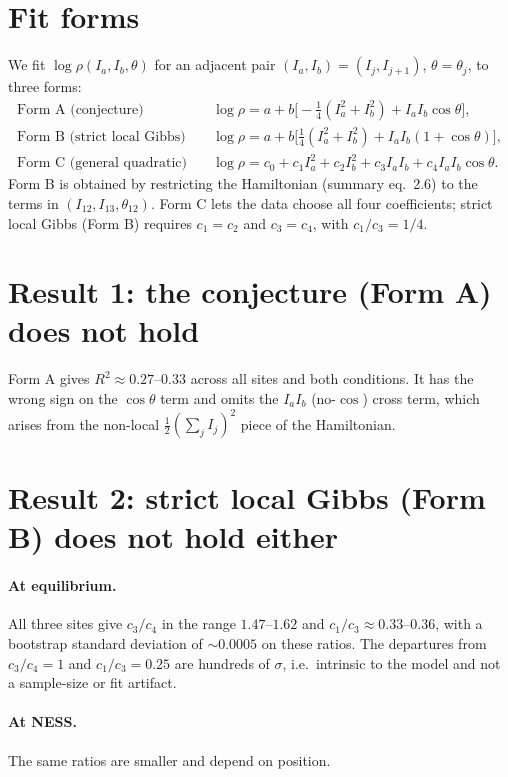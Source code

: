 \documentclass[11pt]{article}
\begin{document}
\section*{Fit forms}
We fit $\log\rho(I_a,I_b,\theta)$ for an adjacent pair $(I_a,I_b)=(I_j,I_{j+1})$,
$\theta=\theta_j$, to three forms:
\begin{align*}
\text{Form A (conjecture)}\quad
& \log\rho = a + b\bigl[-\tfrac{1}{4}(I_a^2+I_b^2) + I_a I_b\cos\theta\bigr], \\
\text{Form B (strict local Gibbs)}\quad
& \log\rho = a + b\bigl[\tfrac{1}{4}(I_a^2+I_b^2) + I_a I_b(1+\cos\theta)\bigr], \\
\text{Form C (general quadratic)}\quad
& \log\rho = c_0 + c_1 I_a^2 + c_2 I_b^2 + c_3 I_a I_b + c_4 I_a I_b\cos\theta .
\end{align*}
Form B is obtained by restricting the Hamiltonian (summary eq.~2.6) to the terms
in $(I_{12}, I_{13}, \theta_{12})$. Form C lets the data choose all four
coefficients; strict local Gibbs (Form B) requires $c_1=c_2$ and $c_3=c_4$, with
$c_1/c_3 = 1/4$.

\section*{Result 1: the conjecture (Form A) does not hold}
Form A gives $R^2 \approx 0.27$--$0.33$ across all sites and both conditions. It
has the wrong sign on the $\cos\theta$ term and omits the $I_a I_b$ (no-$\cos$)
cross term, which arises from the non-local $\tfrac{1}{2}(\sum_j I_j)^2$ piece of
the Hamiltonian.

\section*{Result 2: strict local Gibbs (Form B) does not hold either}
\paragraph{At equilibrium.} All three sites give $c_3/c_4$ in the range
$1.47$--$1.62$ and $c_1/c_3 \approx 0.33$--$0.36$, with a bootstrap standard
deviation of ${\sim}0.0005$ on these ratios. The departures from $c_3/c_4=1$ and
$c_1/c_3=0.25$ are hundreds of $\sigma$, i.e.\ intrinsic to the model and not a
sample-size or fit artifact.

\paragraph{At NESS.} The same ratios are smaller and depend on position.
\end{document}
